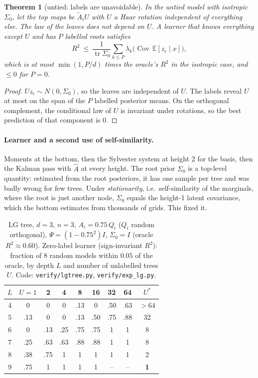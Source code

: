 \documentclass[11pt]{article}
\newtheorem{theorem}{Theorem}
\theoremstyle{definition}
\newcommand{\E}{\mathbb{E}}
\newcommand{\Cov}{\operatorname{Cov}}
\begin{document}
\begin{theorem}[untied: labels are unavoidable]\label{thm:cuntied}
In the untied model with isotropic $\Sigma_0$, let the top maps be $\tilde A_iU$ with $U$ a Haar
rotation independent of everything else. The law of the leaves does not depend on $U$. A
learner that knows everything except $U$ and has $P$ labelled roots satisfies
\[
R^2\ \le\ \frac{1}{\operatorname{tr}\Sigma_0}\sum_{k\le P}\lambda_k\big(\Cov\,\E[z_\epsilon\mid x]\big),
\]
which is at most $\min(1,P/d)$ times the oracle's $R^2$ in the isotropic case, and $\le0$ for $P=0$.
\end{theorem}
\begin{proof}
$Uz_\epsilon\sim N(0,\Sigma_0)$, so the leaves are independent of $U$. The labels reveal $U$ at
most on the span of the $P$ labelled posterior means. On the orthogonal complement, the
conditional law of $U$ is invariant under rotations, so the best prediction of that component is
$0$.
\end{proof}

\paragraph{Learner and a second use of self-similarity.} Moments at the bottom, then the Sylvester
system at height 2 for the basis, then the Kalman pass with $\hat A$ at every height. The root
prior $\Sigma_0$ is a top-level quantity: estimated from the root posteriors, it has one sample
per tree and was badly wrong for few trees. Under \emph{stationarity}, i.e.\ self-similarity of
the marginals, where the root is just another node, $\Sigma_0$ equals the height-1 latent
covariance, which the bottom estimates from thousands of grids. This fixed it.

\begin{table}[h]\centering
\caption{LG tree, $d=3$, $n=3$, $A_i=0.75\,Q_i$ ($Q_i$ random orthogonal), $\Psi=(1-0.75^2)I$,
$\Sigma_0=I$ (oracle $R^2\approx0.60$). Zero-label learner (sign-invariant $R^2$): fraction of 8
random models within $0.05$ of the oracle, by depth $L$ and number of unlabelled trees $U$.
Code: \texttt{verify/lgtree.py}, \texttt{verify/exp\_lg.py}.}\label{tab:lgzero}
\small\begin{tabular}{c|ccccccc|c}\toprule
$L$ & $U{=}1$ & 2 & 4 & 8 & 16 & 32 & 64 & $U^*$\\ \midrule
4 & 0 & 0 & 0 & .13 & 0 & .50 & .63 & $>64$\\
5 & .13 & 0 & 0 & .13 & .50 & .75 & .88 & 32\\
6 & 0 & .13 & .25 & .75 & .75 & 1 & 1 & 8\\
7 & .25 & .63 & .63 & .88 & .88 & 1 & 1 & 8\\
8 & .38 & .75 & 1 & 1 & 1 & 1 & 1 & 2\\
9 & .75 & 1 & 1 & 1 & 1 & -- & -- & \textbf{1}\\
\bottomrule\end{tabular}
\end{table}
\end{document}
